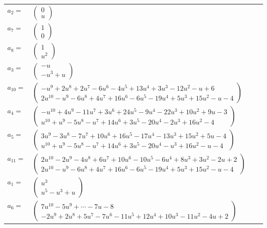 \documentclass[1p]{elsarticle_modified}
\theoremstyle{definition}
\begin{document}
\begin{tabular}{m{7pt} m{180pt} m{7pt} m{180pt} }
\flushright $a_{2}=$&$\begin{pmatrix}0\\u\end{pmatrix}$ \\
\flushright $a_{7}=$&$\begin{pmatrix}1\\0\end{pmatrix}$ \\
\flushright $a_{8}=$&$\begin{pmatrix}1\\u^2\end{pmatrix}$ \\
\flushright $a_{3}=$&$\begin{pmatrix}- u\\- u^3+u\end{pmatrix}$ \\
\flushright $a_{10}=$&$\begin{pmatrix}- u^9+2 u^8+2 u^7-6 u^6-4 u^5+13 u^4+3 u^3-12 u^2- u+6\\2 u^{10}- u^9-6 u^8+4 u^7+16 u^6-6 u^5-19 u^4+5 u^3+15 u^2- u-4\end{pmatrix}$ \\
\flushright $a_{4}=$&$\begin{pmatrix}- u^{10}+4 u^9-11 u^7+3 u^6+24 u^5-9 u^4-22 u^3+10 u^2+9 u-3\\u^{10}+u^9-5 u^8- u^7+14 u^6+3 u^5-20 u^4-2 u^3+16 u^2-4\end{pmatrix}$ \\
\flushright $a_{5}=$&$\begin{pmatrix}3 u^9-3 u^8-7 u^7+10 u^6+16 u^5-17 u^4-13 u^3+15 u^2+5 u-4\\u^{10}+u^9-5 u^8- u^7+14 u^6+3 u^5-20 u^4- u^3+16 u^2- u-4\end{pmatrix}$ \\
\flushright $a_{11}=$&$\begin{pmatrix}2 u^{10}-2 u^9-4 u^8+6 u^7+10 u^6-10 u^5-6 u^4+8 u^3+3 u^2-2 u+2\\2 u^{10}- u^9-6 u^8+4 u^7+16 u^6-6 u^5-19 u^4+5 u^3+15 u^2- u-4\end{pmatrix}$ \\
\flushright $a_{1}=$&$\begin{pmatrix}u^3\\u^5- u^3+u\end{pmatrix}$ \\
\flushright $a_{6}=$&$\begin{pmatrix}7 u^{10}-5 u^9+\cdots-7 u-8\\-2 u^9+2 u^8+5 u^7-7 u^6-11 u^5+12 u^4+10 u^3-11 u^2-4 u+2\end{pmatrix}$ \\

\end{tabular}
\end{document}

